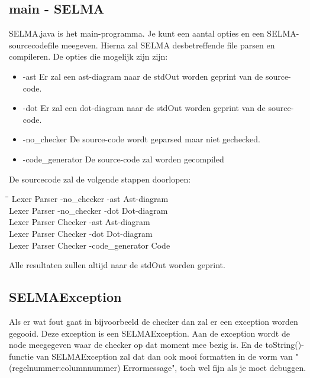 \documentclass[]{article}
\begin{document}
\subsection{main - SELMA}
SELMA.java is het main-programma. Je kunt een aantal opties en een SELMA-sourcecodefile meegeven.
Hierna zal SELMA desbetreffende file parsen en compileren. De opties die mogelijk zijn zijn:
\begin{itemize}
\item -ast Er zal een ast-diagram naar de stdOut worden geprint van de source-code.
\item -dot Er zal een dot-diagram naar de stdOut worden geprint van de source-code.
\item -no\_checker De source-code wordt geparsed maar niet gechecked.
\item -code\_generator De source-code zal worden gecompiled
\end{itemize}
De sourcecode zal de volgende stappen doorlopen: \\
\begin{tabbing}
\hspace{5em}\=\hspace{5em}\=\hspace{7em}\=\hspace{5em}\=\hspace{10em}\=\kill
Lexer \>  Parser \> -no\_checker 	\>   		\> -ast \>  Ast-diagram \\
Lexer \>  Parser \> -no\_checker 	\>   		\> -dot \>  Dot-diagram \\
Lexer \>  Parser \>  				\>  Checker \> -ast \>  Ast-diagram \\
Lexer \>  Parser \>  				\>  Checker \> -dot \>  Dot-diagram \\
Lexer \>  Parser \>  				\>  Checker \> -code\_generator \>  Code 
\end{tabbing} 
Alle resultaten zullen altijd naar de stdOut worden geprint.

\subsection{SELMAException}
Als er wat fout gaat in bijvoorbeeld de checker dan zal er een exception worden gegooid. Deze exception is een SELMAException. Aan de exception wordt de node meegegeven waar de checker op dat moment mee bezig is. En de toString()-functie van SELMAException zal dat dan ook mooi formatten in de vorm van "(regelnummer:columnnummer) Errormessage", toch wel fijn als je moet debuggen. 
\end{document}
